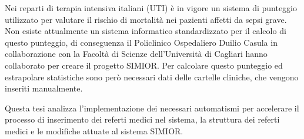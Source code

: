 \vspace{4cm}
Nei reparti di terapia intensiva italiani (UTI) è in vigore un sistema di punteggio utilizzato per valutare il rischio di mortalità nei pazienti affetti da sepsi grave. Non esiste attualmente un sistema informatico standardizzato per il calcolo di questo punteggio, di conseguenza il Policlinico Ospedaliero Duilio Casula in collaborazione con la Facoltà di Scienze dell'Università di Cagliari hanno collaborato per creare il progetto SIMIOR. Per calcolare questo punteggio ed estrapolare statistiche sono però necessari dati delle cartelle cliniche, che vengono inseriti manualmente.
\par\bigskip
Questa tesi analizza l'implementazione dei necessari automatismi per accelerare il processo di inserimento dei referti medici nel sistema, la struttura dei referti medici e le modifiche attuate al sistema SIMIOR.